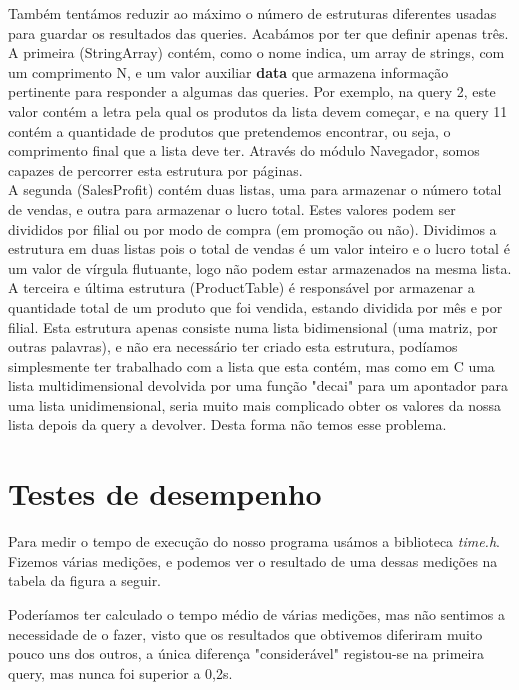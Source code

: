 \documentclass[a4paper]{report}
\begin{document}
	Também tentámos reduzir ao máximo o número de estruturas diferentes usadas para guardar os resultados das queries. Acabámos por ter que definir apenas três.\\
	\indent
	A primeira (StringArray) contém, como o nome indica, um array de strings, com um comprimento N, e um valor auxiliar \textbf{data} que armazena informação pertinente para responder a algumas das queries. Por exemplo, na query 2, este valor contém a letra pela qual os produtos da lista devem começar, e na query 11 contém a quantidade de produtos que pretendemos encontrar, ou seja, o comprimento final que a lista deve ter. Através do módulo Navegador, somos capazes de percorrer esta estrutura por páginas.\\
	\indent
	A segunda (SalesProfit) contém duas listas, uma para armazenar o número total de vendas, e outra para armazenar o lucro total. Estes valores podem ser divididos por filial ou por modo de compra (em promoção ou não). Dividimos a estrutura em duas listas pois o total de vendas é um valor inteiro e o lucro total é um valor de vírgula flutuante, logo não podem estar armazenados na mesma lista.\\
	\indent
	A terceira e última estrutura (ProductTable) é responsável por armazenar a quantidade total de um produto que foi vendida, estando dividida por mês e por filial. Esta estrutura apenas consiste numa lista bidimensional (uma matriz, por outras palavras), e não era necessário ter criado esta estrutura, podíamos simplesmente ter trabalhado com a lista que esta contém, mas como em C uma lista multidimensional devolvida por uma função "decai" para um apontador para uma lista unidimensional, seria muito mais complicado obter os valores da nossa lista depois da query a devolver. Desta forma não temos esse problema.
	
	\chapter{Testes de desempenho}
	
	Para medir o tempo de execução do nosso programa usámos a biblioteca \emph{time.h}. Fizemos várias medições, e podemos ver o resultado de uma dessas medições
	na tabela da figura a seguir.

	Poderíamos ter calculado o tempo médio de várias medições, mas não sentimos a necessidade de o fazer, visto que os resultados que obtivemos diferiram
	muito pouco uns dos outros, a única diferença "considerável" registou-se na primeira query, mas nunca foi superior a 0,2s.
	
\end{document}
